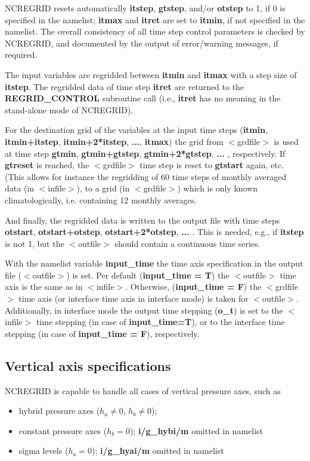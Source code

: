 \documentclass[12pt, a4paper]{article}
\begin{document}
NCREGRID resets automatically {\bf itstep}, {\bf gtstep}, and/or {\bf otstep}
to 1, if 0 is specified in the namelist; {\bf itmax} and {\bf itret} are set to
{\bf itmin}, if not specified in the namelist.
The overall consistency of all time step control parameters is checked
by NCREGRID, and documented by the output of error/warning messages,
if required.

The input variables are regridded between {\bf itmin} and {\bf itmax} with a
step size of {\bf itstep}. The regridded data of time step {\bf itret} are
returned to the {\bf REGRID\_CONTROL} subroutine call
(i.e., {\bf itret} has no meaning in the stand-alone mode of NCREGRID).

For the destination grid of the variables at the input time steps
({\bf itmin}, {\bf itmin+itstep}, {\bf itmin+2*itstep}, {\bf ...}, {\bf itmax})
the grid from $<$grdfile$>$
is used at time step {\bf gtmin}, {\bf gtmin+gtstep},
{\bf gtmin+2*gtstep}, {\bf ...} , respectively.
If {\bf gtreset} is reached, the $<$grdfile$>$ time step
is reset to {\bf gtstart} again, etc.
(This allows for instance the regridding of 60 time steps of monthly averaged
data (in $<$infile$>$), to a grid (in $<$grdfile$>$) which is only known
climatologically, i.e. containing 12 monthly averages.

And finally, the regridded data is written to the output file with
time steps {\bf otstart}, {\bf otstart+otstep}, {\bf otstart+2*otstep},
{\bf ...} .
This is needed, e.g., if {\bf itstep} is not 1, but the $<$outfile$>$
should contain a continuous time series.

With the namelist variable {\bf input\_time} the time axis specification in the
output file ($<$outfile$>$) is set. Per default ({\bf input\_time = T}) 
the $<$outfile$>$ time axis is the same as in $<$infile$>$.
Otherwise, ({\bf input\_time = F}) the $<$grdfile$>$ time axis
(or interface time axis in interface mode) is taken for $<$outfile$>$.
%
Additionally, in interface mode the output time stepping
({\bf o\_t}) is set to the $<$infile$>$ time stepping (in case of
{\bf input\_time=T}), or to the interface time
stepping (in case of {\bf input\_time = F}), respectively.

\subsection{Vertical axis specifications}
NCREGRID is capable to handle all cases of vertical
pressure axes, such as
\begin{itemize}
\item hybrid pressure axes ($h_a \neq 0$, $h_b \neq 0$);
\item constant pressure axes ($h_b = 0$); {\bf i/g\_hybi/m} omitted in namelist
\item sigma levels ($h_a = 0$);  {\bf i/g\_hyai/m} omitted in namelist
\end{itemize}
\end{document}
